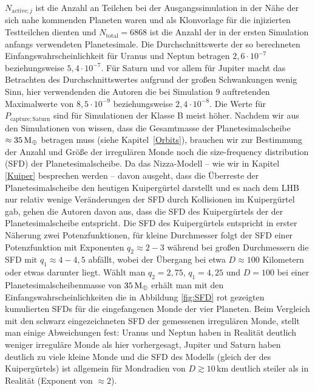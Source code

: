 \documentclass[12pt,a4paper,twoside]{article}
\renewcommand{\cite}{\citep}
\newcommand{\refsec}[1]{siehe Kapitel~\ref{#1}}
\newcommand{\ME}{M_\oplus}
\begin{document}
$N_{\mathrm{active}; j}$ ist die Anzahl an Teilchen bei der Ausgangssimulation in der Nähe der sich nahe kommenden Planeten waren und als Klonvorlage für die injizierten Testteilchen dienten und $N_{\mathrm{total}} = 6868$ ist die Anzahl der in der ersten Simulation anfangs verwendeten Planetesimale\cite{Nesvorny2007}.
Die Durchschnittswerte der so berechneten Einfangswahrscheinlichkeit für Uranus und Neptun betragen $2,6 \cdot 10^{-7}$ beziehungsweise $5,4 \cdot 10^{-7}$.
Für Saturn und vor allem für Jupiter macht das Betrachten des Durchschnittswertes aufgrund der großen Schwankungen wenig Sinn, hier verwendenden die Autoren die bei Simulation 9 auftretenden Maximalwerte von $8,5 \cdot 10^{-9}$ beziehungsweise $2,4 \cdot 10^{-8}$\cite{Nesvorny2007}.
Die Werte für $P_{\mathrm{capture;Saturn}}$ sind für Simulationen der Klasse B meist höher\cite{Nesvorny2007}.
Nachdem wir aus den Simulationen von \cite{Tsiganis2005} wissen, dass die Gesamtmasse der Planetesimalscheibe $\approx\unit[35]{\ME}$ betragen muss (\refsec{Orbits}),
brauchen wir zur Bestimmung der Anzahl und Größe der irregulären Monde noch die size-frequency distribution (SFD) der Planetesimalscheibe.
Da das Nizza-Modell – wie wir in Kapitel \ref{Kuiper} besprechen werden – davon ausgeht, dass die Überreste der Planetesimalscheibe den heutigen Kuipergürtel darstellt und es nach dem LHB nur relativ wenige Veränderungen der SFD durch Kollisionen im Kuipergürtel gab, gehen die Autoren davon aus, dass die SFD des Kuipergürtels der der Planetesimalscheibe entspricht\cite{Nesvorny2007}.
Die SFD des Kuipergürtels entspricht in erster Näherung zwei Potenzfunktionen, für kleine Durchmesser folgt der SFD einer Potenzfunktion mit Exponenten $q_2 \approx 2-3$ während bei großen Durchmessern die SFD mit $q_1 \approx 4-4,5$ abfällt, wobei der Übergang bei etwa $D \approx 100$ Kilometern oder etwas darunter liegt\cite{Gladman2001,Trujillo2001a,Bernstein2004,Petit2006,Nesvorny2007}.
Wählt man $q_2 = 2,75$, $q_1 = 4,25$ und $D = 100$ bei einer Planetesimalscheibenmasse von $\unit[35]{\ME}$ erhält man mit den  Einfangswahrscheinlichkeiten die in Abbildung \ref{fig:SFD} rot gezeigten kumulierten SFDs für die eingefangenen Monde der vier Planeten.
Beim Vergleich mit den schwarz eingezeichneten SFD der gemessenen irregulären Monde,
stellt man einige Abweichungen fest:
Uranus und Neptun haben in Realität deutlich weniger irreguläre Monde als hier vorhergesagt,
Jupiter und Saturn haben deutlich zu viele kleine Monde und die SFD des Modells (gleich der des Kuipergürtels) ist allgemein für Mondradien von $D\gtrsim 10 \, \mathrm{km}$ deutlich steiler als in Realität (Exponent von $\approx2$)\cite{Nesvorny2007}.
\end{document}
